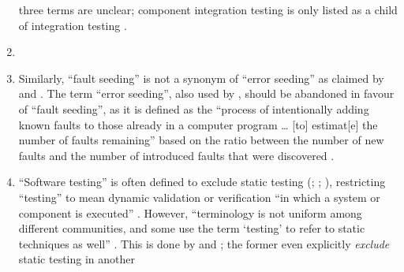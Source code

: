 \begin{enumerate}
          three terms are unclear;
          component integration testing is only listed as a child of
          integration testing \citepISTQB{}.
    \item %
          \errorGuessFlaw{}
    \item %
          Similarly, ``fault seeding'' is not a synonym of ``error seeding''
          as claimed by \citet[p.~165]{IEEE2017} and
          \citet[p.~427]{vanVliet2000}. The term ``error seeding'', also
          used by \citet[p.~34]{Firesmith2015},
          should be abandoned in favour of ``fault seeding'', as it is defined
          as the ``process of intentionally adding known faults to those
          already in a computer program \dots{} [to] estimat[e] the number of
          faults remaining'' \citep[p.~165]{IEEE2017} based on the ratio
          between the number of new faults and the number of introduced faults
          that were discovered \citep[p.~427]{vanVliet2000}.
    \item %
          ``Software testing'' is often defined to exclude static testing
          (\citealp[p.~13]{Firesmith2015}; \citealp[p.~222]{AmmannAndOffutt2017};
          \citealp[p.~439]{PetersAndPedrycz2000}), restricting ``testing'' to
          mean dynamic validation \citep[p.~5\=/1]{SWEBOK2024} or verification
          ``in which a system or component is executed'' \citep[p.~427]{IEEE2017}.
          However, ``terminology is not uniform among different communities, and
          some use the term `testing' to refer to static techniques%
           as well'' \citep[p.~5\=/2]{SWEBOK2024}.
          This is done by \citet[pp.~16\==17]{IEEE2022} and
          \citet[pp.~8\==9]{Gerrard2000a}; the former even explicitly
          \emph{exclude} static testing in another

\end{enumerate}
